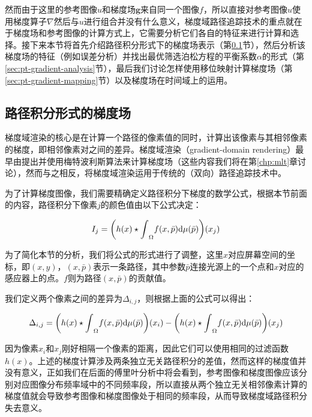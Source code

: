 然而由于这里的参考图像$u$和梯度场$\mathbf{g}$来自同一个图像$f$，所以直接对参考图像$u$使用梯度算子$\nabla$然后与$u$进行组合并没有什么意义，梯度域路径追踪技术的重点就在于梯度场和参考图像的计算方式上，它需要分析它们各自的特征来进行计算和选择。接下来本节将首先介绍路径积分形式下的梯度场表示（第\ref{sec:pt-gradient-form}节），然后分析该梯度场的特征（例如误差分析）并找出最优筛选泊松方程的平衡系数$\alpha$的形式（第\ref{sec:pt-gradient-analysis}节），最后我们讨论怎样使用移位映射计算梯度场（第\ref{sec:pt-gradient-mapping}节）以及梯度场在时间域上的运用。





\subsection{路径积分形式的梯度场}\label{sec:pt-gradient-form}
梯度域渲染的核心是在计算一个路径的像素值的同时，计算出该像素与其相邻像素的梯度，即相邻像素对之间的差异。梯度域渲染（gradient-domain rendering）最早由\cite{a:GradientDomainMetropolisLightTransport}提出并使用梅特波利斯算法来计算梯度场（这些内容我们将在第\ref{chp:mlt}章讨论），然而与之相反，\cite{a:GradientDomainPathTracing,a:Gradient-DomainBidirectionalPathTracing}将梯度域渲染运用于传统的（双向）路径追踪技术中。

为了计算梯度图像，我们需要精确定义路径积分下梯度的数学公式，根据本节前面的内容，路径积分下像素$j$的颜色值由以下公式决定：

\begin{equation}
	I_j=\bigg(h(x)\star{\rm \int}_\Omega f(x, \bar{p}){\rm d}\mu(\bar{p})  \bigg)(x_j)
\end{equation}

为了简化本节的分析，我们将公式的形式进行了调整，这里$x$对应屏幕空间的坐标，即$(x,y)$，$(x,\bar{p})$表示一条路径，其中参数$\bar{p}$连接光源上的一个点和$x$对应的感应器上的点。$f$则为路径$(x,\bar{p})$的贡献值。 

我们定义两个像素之间的差异为$\Delta_{i,j}$，则根据上面的公式可以得出：

\begin{equation}
	\Delta_{i,j}=\bigg(h(x)\star{\rm \int}_\Omega f(x, \bar{p}){\rm d}\mu(\bar{p})  \bigg)(x_i)-\bigg(h(x)\star{\rm \int}_\Omega f(x, \bar{p}){\rm d}\mu(\bar{p})  \bigg)(x_j)
\end{equation}

因为像素$x_i$和$x_j$刚好相隔一个像素的距离，因此它们可以使用相同的过滤函数$h(x)$。上述的梯度计算涉及两条独立无关路径积分的差值，然而这样的梯度值并没有意义，正如我们在后面的傅里叶分析中将会看到，参考图像和梯度图像应该分别对应图像分布频率域中的不同频率段，所以直接从两个独立无关相邻像素计算的梯度值就会导致参考图像和梯度图像处于相同的频率段，从而导致梯度域路径积分失去意义。


